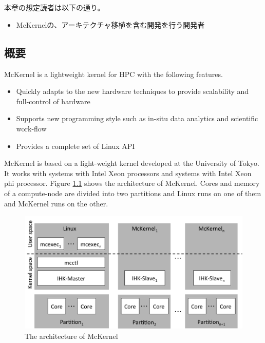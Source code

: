 \documentclass[twoside,11pt,fleqn]{book}
\begin{document}
\chapter{}\label{chap:structure}
本章の想定読者は以下の通り。
\begin{itemize}
\item McKernelの、アーキテクチャ移植を含む開発を行う開発者
\end{itemize}

\section{概要}
McKernel is a lightweight kernel for HPC with the following features.
\begin{itemize}
\item Quickly adapts to the new hardware techniques to provide scalability and full-control of hardware
\item Supports new programming style such as in-situ data analytics and scientific work-flow
\item Provides a complete set of Linux API
\end{itemize}

McKernel is based on a light-weight kernel developed at the University of Tokyo\cite{ihk}.
It works with systems with Intel Xeon processors and systems with Intel Xeon phi processor.
Figure \ref{fig:arch_overview} shows the architecture of McKernel.
Cores and memory of a compute-node are divided into two partitions and Linux runs on one of them and McKernel runs on the other.
\begin{figure}[!htb]
\centering
\includegraphics[width=14cm]{figs/arch_overview.pdf}
\vspace{-0em}\caption{The architecture of McKernel}
\label{fig:arch_overview}
\vspace{-0em}
\end{figure}
\FloatBarrier
\end{document}
